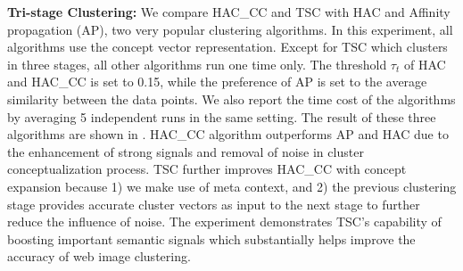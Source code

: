 \textbf{Tri-stage Clustering:}
We compare HAC\_CC and TSC with
HAC and Affinity propagation (AP), two very popular clustering algorithms.
In this experiment, all algorithms use the concept vector representation.
Except for TSC which clusters in three stages,
all other algorithms run one time only.
The threshold $\tau_t$ of HAC and HAC\_CC is set to 0.15, while
the preference of AP is set to the average similarity between
the data points. We also report the time cost of the algorithms
by averaging 5 independent runs in the same setting.
The result of these three algorithms are shown in
.
%
%
%
HAC\_CC algorithm outperforms AP
and HAC due to the enhancement of strong signals and removal of noise in
cluster conceptualization process.
TSC further improves HAC\_CC with concept expansion
because 1) we make use of meta context, and 2)
the previous clustering stage provides accurate cluster vectors
as input to the next stage to further reduce the influence of noise.
The experiment demonstrates TSC's capability of boosting important
semantic signals which substantially helps improve the accuracy of
web image clustering.

